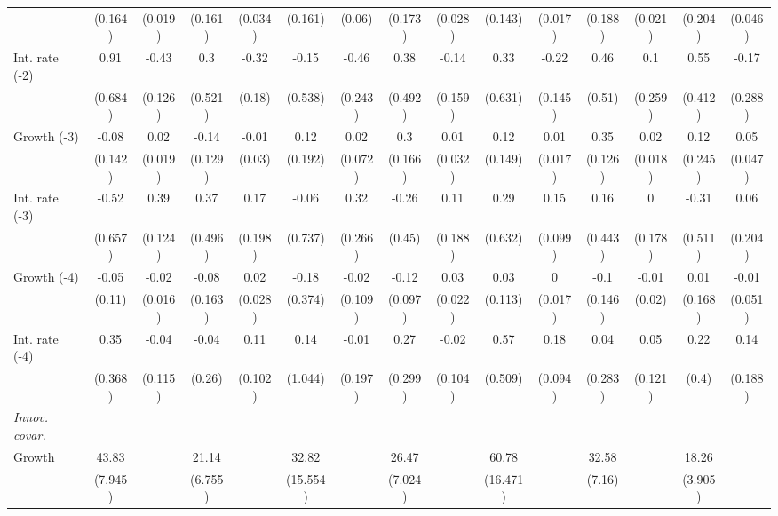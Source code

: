 \begin{table}[htbp]
\begin{tabular}{@{\extracolsep{4pt}}lcccccccccccccc@{}}
 		 & (0.164) 	 & (0.019) 	 & (0.161) 	 & (0.034) 	 & (0.161) 	 & (0.06) 	 & (0.173) 	 & (0.028) 	 & (0.143) 	 & (0.017) 	 & (0.188) 	 & (0.021) 	 & (0.204) 	 & (0.046) 	 \\ 
\quad Int. rate (-2) 	 &0.91 	 & -0.43 	 & 0.3 	 & -0.32 	 & -0.15 	 & -0.46 	 & 0.38 	 & -0.14 	 & 0.33 	 & -0.22 	 & 0.46 	 & 0.1 	 & 0.55 	 & -0.17	 \\ 
 		 & (0.684) 	 & (0.126) 	 & (0.521) 	 & (0.18) 	 & (0.538) 	 & (0.243) 	 & (0.492) 	 & (0.159) 	 & (0.631) 	 & (0.145) 	 & (0.51) 	 & (0.259) 	 & (0.412) 	 & (0.288) 	 \\ 
\quad Growth (-3) 	 &-0.08 	 & 0.02 	 & -0.14 	 & -0.01 	 & 0.12 	 & 0.02 	 & 0.3 	 & 0.01 	 & 0.12 	 & 0.01 	 & 0.35 	 & 0.02 	 & 0.12 	 & 0.05	 \\ 
 		 & (0.142) 	 & (0.019) 	 & (0.129) 	 & (0.03) 	 & (0.192) 	 & (0.072) 	 & (0.166) 	 & (0.032) 	 & (0.149) 	 & (0.017) 	 & (0.126) 	 & (0.018) 	 & (0.245) 	 & (0.047) 	 \\ 
\quad Int. rate (-3) 	 &-0.52 	 & 0.39 	 & 0.37 	 & 0.17 	 & -0.06 	 & 0.32 	 & -0.26 	 & 0.11 	 & 0.29 	 & 0.15 	 & 0.16 	 & 0 	 & -0.31 	 & 0.06	 \\ 
 		 & (0.657) 	 & (0.124) 	 & (0.496) 	 & (0.198) 	 & (0.737) 	 & (0.266) 	 & (0.45) 	 & (0.188) 	 & (0.632) 	 & (0.099) 	 & (0.443) 	 & (0.178) 	 & (0.511) 	 & (0.204) 	 \\ 
\quad Growth (-4) 	 &-0.05 	 & -0.02 	 & -0.08 	 & 0.02 	 & -0.18 	 & -0.02 	 & -0.12 	 & 0.03 	 & 0.03 	 & 0 	 & -0.1 	 & -0.01 	 & 0.01 	 & -0.01	 \\ 
 		 & (0.11) 	 & (0.016) 	 & (0.163) 	 & (0.028) 	 & (0.374) 	 & (0.109) 	 & (0.097) 	 & (0.022) 	 & (0.113) 	 & (0.017) 	 & (0.146) 	 & (0.02) 	 & (0.168) 	 & (0.051) 	 \\ 
\quad Int. rate (-4) 	 &0.35 	 & -0.04 	 & -0.04 	 & 0.11 	 & 0.14 	 & -0.01 	 & 0.27 	 & -0.02 	 & 0.57 	 & 0.18 	 & 0.04 	 & 0.05 	 & 0.22 	 & 0.14	 \\ 
 		 & (0.368) 	 & (0.115) 	 & (0.26) 	 & (0.102) 	 & (1.044) 	 & (0.197) 	 & (0.299) 	 & (0.104) 	 & (0.509) 	 & (0.094) 	 & (0.283) 	 & (0.121) 	 & (0.4) 	 & (0.188) 	 \\ 
\rule{0pt}{4ex} \emph{Innov. covar.}  	 & 	 & 	 & 	 & 	 & 	 & 	 & 	 & 	 & 	 & 	 & 	 & 	 & 	 &\\ 
\quad Growth 	 &43.83 	 &  	 & 21.14 	 &  	 & 32.82 	 &  	 & 26.47 	 &  	 & 60.78 	 &  	 & 32.58 	 &  	 & 18.26 	 & 	 \\ 
 		 & (7.945) 	 &  	 & (6.755) 	 &  	 & (15.554) 	 &  	 & (7.024) 	 &  	 & (16.471) 	 &  	 & (7.16) 	 &  	 & (3.905) 	 &  	 \\ 

\end{tabular}
\end{table}
